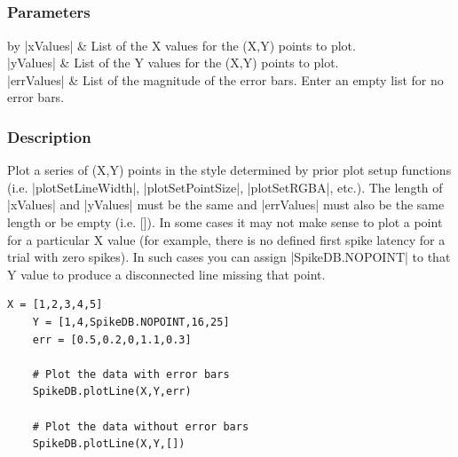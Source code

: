 \documentclass{report}
\begin{document}
\clearpage
\subsection[\method{void}{plotLine}]{}
\subsubsection{Parameters}
\begin{table}[h]
\begin{center}
\begin{tabular}{by}
		|xValues| & List of the X values for the (X,Y) points to plot.\\
		|yValues| & List of the Y values for the (X,Y) points to plot.\\
		|errValues| & List of the magnitude of the error bars. Enter an empty list for no error bars.\\
	\end{tabular}
\end{center}
\end{table}
\subsubsection{Description}
Plot a series of (X,Y) points in the style determined by prior plot setup functions (i.e. |plotSetLineWidth|, |plotSetPointSize|, |plotSetRGBA|, etc.). The length of |xValues| and |yValues| must be the same and |errValues| must also be the same length or be empty (i.e. []). In some cases it may not make sense to plot a point for a particular X value (for example, there is no defined first spike latency for a trial with zero spikes).  In such cases you can assign |SpikeDB.NOPOINT| to that Y value to produce a disconnected line missing that point.
\begin{lstlisting}[caption=Example]
	X = [1,2,3,4,5]
	Y = [1,4,SpikeDB.NOPOINT,16,25]
	err = [0.5,0.2,0,1.1,0.3]

	# Plot the data with error bars
	SpikeDB.plotLine(X,Y,err)

	# Plot the data without error bars
	SpikeDB.plotLine(X,Y,[])
\end{lstlisting}



\clearpage
\subsection[\method{void}{plotSetLineWidth}]{}
\end{document}
